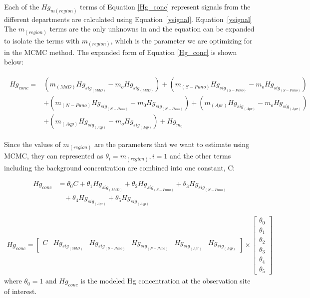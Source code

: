 \begin{flushleft}
Each of the $Hg_{m(region)}$ terms of Equation \ref{Hg_conc} represent signals from the different departments are calculated using Equation~\ref{ysignal}. Equation~\ref{ysignal} The $m_(region)$ terms are the only unknowns in  and the equation can be expanded to isolate the terms with $m_(region)$, which is the parameter we are optimizing for in the MCMC method. The expanded form of Equation \ref{Hg_conc} is shown below:

\begin{align}
\begin{split}\label{Cs36PoGd2l}
Hg_{conc}={}& (m_{(MdD)}Hg_{sig_{(MdD)}} -m_oHg_{sig_{(MdD)}})+ (m_{(S-Puno)}Hg_{sig_{(S-Puno)}} -m_oHg_{sig_{(S-Puno)}}) \\
            &+ (m_{(N-Puno)}Hg_{sig_{(N-Puno)}} -m_0Hg_{sig_{(N-Puno)}}) + (m_{(Apr)}Hg_{sig_{(Apr)}} -m_oHg_{sig_{(Apr)}}) \\
            &+ (m_{(Aqp)}Hg_{sig_{(Aqp)}} -m_oHg_{sig_{(Aqp)}})+Hg_{m_0}
\end{split}
\end{align}

Since the values of $m_{(region)}$ are the parameters that we want to estimate using MCMC, they can represented as $\theta_i=m_{(region)}, i=1$ and the other terms including the background concentration are combined into one constant, C:

\begin{equation}
\begin{aligned}
    Hg_{conc}  & = \theta_0C  + \theta_1Hg_{sig_{(MdD)}}+ \theta_2Hg_{sig_{(S-Puno)}} +  \theta_3Hg_{sig_{(N-Puno)}} \\
                & \ \ \ \  +\theta_4Hg_{sig_{(Apr)}} +  \theta_5Hg_{sig_{(Aqp)}}
\end{aligned}
\end{equation}

\begin{align}
Hg_{conc} =\begin{bmatrix} C & Hg_{sig_{(MdD)}} & Hg_{sig_{(S-Puno)}} &Hg_{sig_{(N-Puno)}} &Hg_{sig_{(Apr)}} &Hg_{sig_{(Aqp)}}\end{bmatrix} \times 
            \begin{bmatrix} \theta_0 \\ \theta_1 \\ \theta_2\\ \theta_3\\ \theta_4\\ \theta_5  \end{bmatrix}
\end{align}
where $\theta_0=1$ and $Hg_{conc}$ is the modeled Hg concentration at the observation site of interest.
\end{flushleft}

